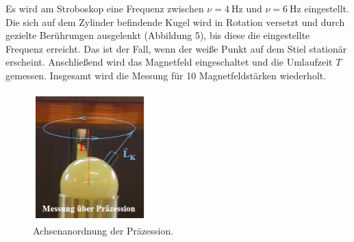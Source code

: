 Es wird am Stroboskop eine Frequenz zwischen $\nu=\SI{4}{\hertz}$ und $\nu=\SI{6}{\hertz}$ eingestellt.
Die sich auf dem Zylinder befindende Kugel wird in Rotation versetzt und durch gezielte Berührungen ausgelenkt (Abbildung 5), 
bis diese die eingestellte Frequenz erreicht.
Das ist der Fall, wenn der weiße Punkt auf dem Stiel stationär erscheint.
Anschließend wird das Magnetfeld eingeschaltet und die Umlaufzeit $T$ gemessen.
Insgesamt wird die Messung für 10 Magnetfeldstärken wiederholt.


\begin{figure}[H]
  \centering
  \includegraphics[height=5cm]{Screenshot (5).png}
  \caption{Achsenanordnung der Präzession. \cite[S. 5]{kent}}
  \label{fig:drill}
\end{figure}